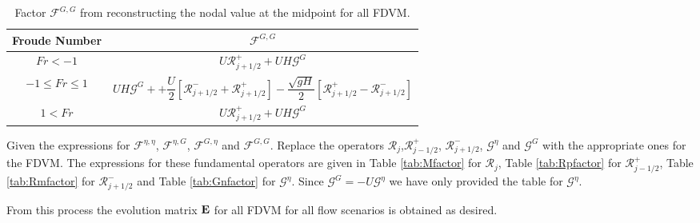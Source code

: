 \begin{table}
	\centering
	\begin{tabular}{c  c }
		Froude Number& $\mathcal{F}^{G,G} $ \T \B\\
		\hline
		$Fr < -1$ & $U\mathcal{R}^+_{j+1/2}  +  UH \mathcal{G}^G$ \T\B \\
		$-1 \le Fr \le 1$ & $ UH\mathcal{G}^{G} + + \dfrac{U}{2} \left[ \mathcal{R}^-_{j+1/2} +\mathcal{R}^+_{j+1/2} \right] - \dfrac{\sqrt{g H}}{2} \left [\mathcal{R}^+_{j+1/2} - \mathcal{R}^-_{j+1/2} \right ]$ \T\B\\
		$1 < Fr$ & $U\mathcal{R}^+_{j+1/2}  +  UH \mathcal{G}^G$ \T\B\\
		\hline
	\end{tabular}
	\caption{Factor $\mathcal{F}^{G,G} $ from reconstructing the nodal value at the midpoint for all FDVM.}
	\label{tab:FGGfactor}
\end{table}

Given the expressions for $\mathcal{F}^{\eta,\eta} $, $\mathcal{F}^{\eta,G}$, $\mathcal{F}^{G,\eta} $ and $\mathcal{F}^{G,G} $. Replace the operators $\mathcal{R}_j$,$\mathcal{R}^+_{j-1/2}$, $\mathcal{R}^-_{j+1/2}$, $\mathcal{G}^\eta$ and $\mathcal{G}^G$ with the appropriate ones for the FDVM. The expressions for these fundamental operators are given in Table \ref{tab:Mfactor} for $\mathcal{R}_j$, Table \ref{tab:Rpfactor} for $\mathcal{R}^+_{j-1/2}$, Table \ref{tab:Rmfactor} for $\mathcal{R}^-_{j+1/2}$ and Table \ref{tab:Gnfactor} for $\mathcal{G}^\eta$. Since $\mathcal{G}^G = -U\mathcal{G}^\eta $ we have only provided the table for $\mathcal{G}^\eta$. 

From this process the evolution matrix $\mathbf{E}$ for all FDVM for all flow scenarios is obtained as desired. 

